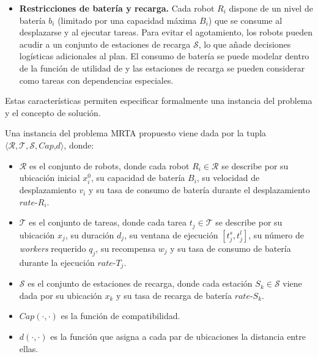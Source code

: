 \begin{itemize}
    \item \textbf{Restricciones de batería y recarga.} Cada robot $R_i$ dispone de un nivel de batería $b_i$ (limitado por una capacidad máxima $B_i$) que se consume al desplazarse y al ejecutar tareas. Para evitar el agotamiento, los robots pueden acudir a un conjunto de estaciones de recarga $\mathcal{S}$, lo que añade decisiones logísticas adicionales al plan. El consumo de batería se puede modelar dentro de la función de utilidad de y las estaciones de recarga se pueden considerar como tareas con dependencias especiales.
\end{itemize}

Estas características permiten especificar formalmente una instancia del problema y el concepto de solución.

\begin{definicion} \label{def:instancia} Una instancia del problema MRTA propuesto viene dada por la tupla $\langle\mathcal{R},\mathcal{T},\mathcal{S},\textit{Cap,}d\rangle$, donde:
\begin{itemize}
    \item $\mathcal{R}$ es el conjunto de robots, donde cada robot $R_i\in\mathcal{R}$ se describe por su ubicación inicial $x_i^0$, su capacidad de batería $B_i$, su velocidad de desplazamiento $v_i$ y su tasa de consumo de batería durante el desplazamiento $\textit{rate-}R_i$.

    \item $\mathcal{T}$ es el conjunto de tareas, donde cada tarea $t_j\in\mathcal{T}$ se describe por su ubicación $x_j$, su duración $d_j$, su ventana de ejecución $[t_j^s,t_j^l]$, su número de \textit{workers} requerido $q_j$, su recompensa $w_j$ y su tasa de consumo de batería durante la ejecución $\textit{rate-}T_j$.

    \item $\mathcal{S}$ es el conjunto de estaciones de recarga, donde cada estación $S_k \in \mathcal{S}$ viene dada por su ubicación $x_k$ y su tasa de recarga de batería $\textit{rate-}S_k$.

    \item $\textit{Cap}(\cdot,\cdot)$ es la función de compatibilidad.

    \item $d(\cdot,\cdot)$ es la función que asigna a cada par de ubicaciones la distancia entre ellas.
\end{itemize}    
\end{definicion}


